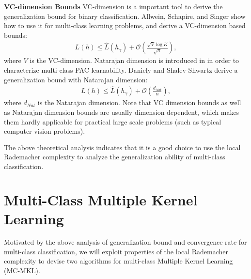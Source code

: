 \documentclass{article}
\begin{document}
\textbf{VC-dimension Bounds}
VC-dimension is a important tool to derive the generalization bound for binary classification.
Allwein, Schapire, and Singer  show how to use it
for multi-class learning problems,
and derive a VC-dimension based bounds:
\begin{align*}
   L(h)\leq  \hat{L}(h_\gamma) +\mathcal{O}\left(\frac{\sqrt{V}\log K}{\sqrt{n}}\right),
\end{align*}
where $V$ is the VC-dimension.
Natarajan dimension is introduced in \cite{Natarajan1989} in
order to characterize multi-class PAC learnability.
Daniely and Shalev-Shwartz  derive a generalization bound with Natarajan dimension:
\begin{align*}
   L(h)\leq  \hat{L}(h_\gamma) +\mathcal{O}\left(\frac{d_{Nat}}{n}\right),
\end{align*}
where $d_{Nat}$ is the Natarajan dimension.
Note that VC dimension bounds as well as Natarajan dimension bounds are usually dimension
dependent, which makes them hardly applicable for practical large
scale problems (such as typical computer vision problems).

The above theoretical analysis indicates that it is a good
choice to use the local Rademacher complexity to analyze the generalization
ability of multi-class classification.

\section{Multi-Class Multiple Kernel Learning}
Motivated by the above analysis of generalization bound and convergence rate for multi-class classification, we will exploit properties of the local Rademacher complexity
to devise two algorithms for multi-class Multiple Kernel Learning (MC-MKL).
\end{document}
